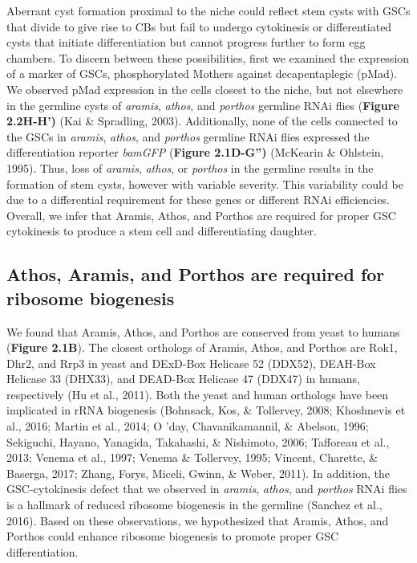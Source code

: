 \documentclass[12pt,oneside]{reedthesis}
\begin{document}
Aberrant cyst formation proximal to the niche could reflect stem cysts
with GSCs that divide to give rise to CBs but fail to undergo
cytokinesis or differentiated cysts that initiate differentiation but
cannot progress further to form egg chambers. To discern between these
possibilities, first we examined the expression of a marker of GSCs,
phosphorylated Mothers against decapentaplegic (pMad). We observed pMad
expression in the cells closest to the niche, but not elsewhere in the
germline cysts of \emph{aramis}, \emph{athos}, and \emph{porthos} germline RNAi flies
(\textbf{Figure 2.2H-H')} (Kai \& Spradling, 2003). Additionally, none
of the cells connected to the GSCs in \emph{aramis}, \emph{athos}, and \emph{porthos}
germline RNAi flies expressed the differentiation reporter \emph{bamGFP}
(\textbf{Figure 2.1D-G'')} (McKearin \& Ohlstein, 1995). Thus, loss of \emph{aramis},
\emph{athos}, or \emph{porthos} in the germline results in the formation of stem
cysts, however with variable severity. This variability could be due to
a differential requirement for these genes or different RNAi
efficiencies. Overall, we infer that Aramis, Athos, and Porthos are
required for proper GSC cytokinesis to produce a stem cell and
differentiating daughter.

\hypertarget{athos-aramis-and-porthos-are-required-for-ribosome-biogenesis}{%
\subsection{Athos, Aramis, and Porthos are required for ribosome biogenesis}\label{athos-aramis-and-porthos-are-required-for-ribosome-biogenesis}}

We found that Aramis, Athos, and Porthos are conserved from yeast to
humans (\textbf{Figure 2.1B}). The closest orthologs of Aramis, Athos, and
Porthos are Rok1, Dhr2, and Rrp3 in yeast and DExD-Box Helicase 52
(DDX52), DEAH-Box Helicase 33 (DHX33), and DEAD-Box Helicase 47 (DDX47)
in humans, respectively (Hu et al., 2011). Both
the yeast and human orthologs have been implicated in rRNA biogenesis
(Bohnsack, Kos, \& Tollervey, 2008; Khoshnevis et al., 2016; Martin et al., 2014; O 'day, Chavanikamannil, \& Abelson, 1996; Sekiguchi, Hayano, Yanagida, Takahashi, \& Nishimoto, 2006; Tafforeau et al., 2013; Venema et al., 1997; Venema \& Tollervey, 1995; Vincent, Charette, \& Baserga, 2017; Zhang, Forys, Miceli, Gwinn, \& Weber, 2011). In addition, the
GSC-cytokinesis defect that we observed in \emph{aramis}, \emph{athos}, and
\emph{porthos} RNAi flies is a hallmark of reduced ribosome biogenesis in the
germline (Sanchez et al., 2016). Based on these observations, we
hypothesized that Aramis, Athos, and Porthos could enhance ribosome
biogenesis to promote proper GSC differentiation.
\end{document}
